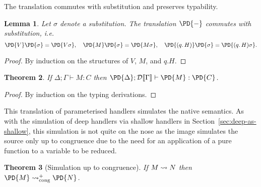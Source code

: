 \documentclass[12pt,phd,lfcs,twoside,openright,logo,leftchapter,normalheadings]{infthesis}
\theoremstyle{plain}
\newtheorem{theorem}{Theorem}[chapter]
\newtheorem{lemma}[theorem]{Lemma}
\theoremstyle{definition}
\begin{document}
The translation commutes with substitution and preserves typability.
%
\begin{lemma}\label{lem:pd-subst}
  Let $\sigma$ denote a substitution. The translation $\PD{-}$
  commutes with substitution, i.e.
  \[
    \PD{V}\PD{\sigma} = \PD{V\sigma},\quad
    \PD{M}\PD{\sigma} = \PD{M\sigma},\quad
    \PD{(q.\,H)}\PD{\sigma} = \PD{(q.\,H)\sigma}.
  \]
\end{lemma}
%
\begin{proof}
  By induction on the structures of $V$, $M$, and $q.H$.
\end{proof}
%
\begin{theorem}
If $\Delta; \Gamma \vdash M : C$ then $\PD{\Delta};
\sdtrans{\Gamma} \vdash \PD{M} : \PD{C}$.
\end{theorem}
%
\begin{proof}
  By induction on the typing derivations.
\end{proof}
%
This translation of parameterised handlers simulates the native
semantics. As with the simulation of deep handlers via shallow
handlers in Section~\ref{sec:deep-as-shallow}, this simulation is not
quite on the nose as the image simulates the source only up to
congruence due to the need for an application of a pure function to a
variable to be reduced.
%
\begin{theorem}[Simulation up to congruence]
  \label{thm:param-simulation}
  If $M \leadsto N$ then $\PD{M} \reducesto^+_{\Cong} \PD{N}$.
\end{theorem}
%
\end{document}
